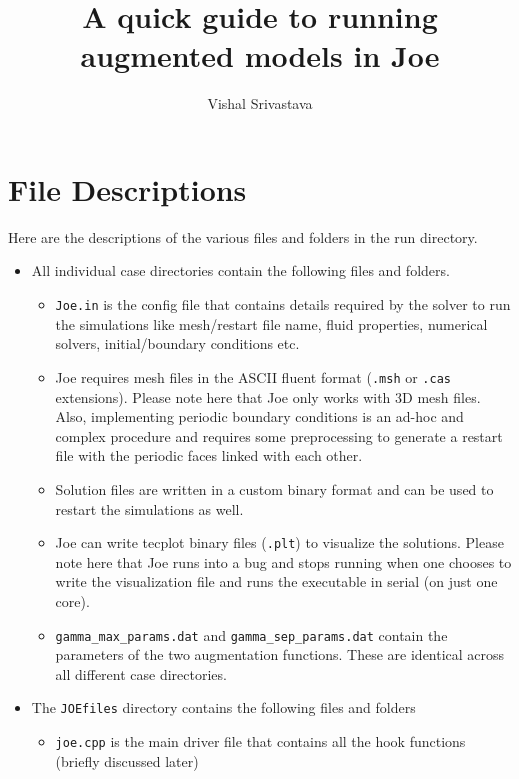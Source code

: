 \documentclass{article}
\title{A quick guide to running augmented models in Joe}
\author{Vishal Srivastava}
\date{\vspace{-2em}}
\begin{document}
\maketitle

\section{File Descriptions}

Here are the descriptions of the various files and folders in the run directory.
\begin{itemize}
    \item All individual case directories contain the following files and folders.
          \begin{itemize}
              \item \texttt{Joe.in} is the config file that contains details required by the solver to run the simulations like mesh/restart file name, fluid properties, numerical solvers, initial/boundary conditions etc.
              \item Joe requires mesh files in the ASCII fluent format (\texttt{.msh} or \texttt{.cas} extensions). {\color[rgb]{0.7,0,0} Please note here that Joe only works with 3D mesh files. Also, implementing periodic boundary conditions is an ad-hoc and complex procedure and requires some preprocessing to generate a restart file with the periodic faces linked with each other.}
              \item Solution files are written in a custom binary format and can be used to restart the simulations as well.
              \item Joe can write tecplot binary files (\texttt{.plt}) to visualize the solutions. {\color[rgb]{0.7,0,0} Please note here that Joe runs into a bug and stops running when one chooses to write the visualization file and runs the executable in serial (on just one core).}
              \item \texttt{gamma\_max\_params.dat} and \texttt{gamma\_sep\_params.dat} contain the parameters of the two augmentation functions. These are identical across all different case directories.
          \end{itemize}
    \item The \texttt{JOEfiles} directory contains the following files and folders
          \begin{itemize}
              \item \texttt{joe.cpp} is the main driver file that contains all the hook functions (briefly discussed later)

\end{itemize}
\end{itemize}
\end{document}
